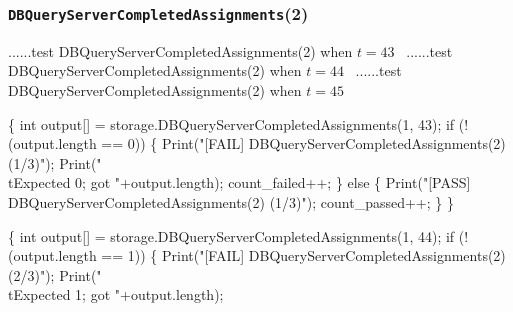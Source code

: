 \documentclass{article}
\def\nwendcode{\endtrivlist \endgroup}
\let\nwdocspar=\par
\theoremstyle{definition}
\begin{document}
\subsubsection{{\tt{}DBQueryServerCompletedAssignments}(2)}
\nwenddocs{}\endmoddef{}
  \LA{}......test \code{}DBQueryServerCompletedAssignments\edoc{}(2) when $t=43$~{\nwtagstyle{}}\RA{}
  \LA{}......test \code{}DBQueryServerCompletedAssignments\edoc{}(2) when $t=44$~{\nwtagstyle{}}\RA{}
  \LA{}......test \code{}DBQueryServerCompletedAssignments\edoc{}(2) when $t=45$~{\nwtagstyle{}}\RA{}
\nwendcode{}\nwdocspar
\nwenddocs{}\endmoddef{}
\{
  int output[] = storage.DBQueryServerCompletedAssignments(1, 43);
  if (!(output.length == 0)) \{
    Print("[FAIL] DBQueryServerCompletedAssignments(2) (1/3)");
    Print("\\tExpected 0; got "+output.length);
    count_failed++;
  \} else \{
    Print("[PASS] DBQueryServerCompletedAssignments(2) (1/3)");
    count_passed++;
  \}
\}
\nwendcode{}\nwdocspar
\nwenddocs{}\endmoddef{}
\{
  int output[] = storage.DBQueryServerCompletedAssignments(1, 44);
  if (!(output.length == 1)) \{
    Print("[FAIL] DBQueryServerCompletedAssignments(2) (2/3)");
    Print("\\tExpected 1; got "+output.length);
\end{document}
